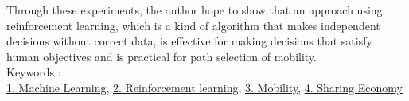 Through these experiments, the author hope to show that an approach using reinforcement learning, which is a kind of algorithm that makes independent decisions without correct data, is effective for making decisions that satisfy human objectives and is practical for path selection of mobility.
~ \\
Keywords : \\
\underline{1. Machine Learning},
\underline{2. Reinforcement learning},
\underline{3. Mobility},
\underline{4. Sharing Economy}
\begin{flushright}
\edept \\
\eauthor
\end{flushright}
